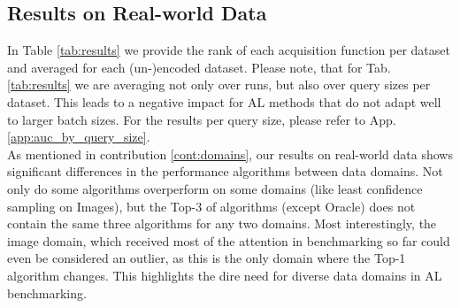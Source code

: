 \documentclass[]{article}
\begin{document}
\subsection{Results on Real-world Data}
In Table \ref{tab:results} we provide the rank of each acquisition function per dataset and averaged for each (un-)encoded dataset. 
Please note, that for Tab. \ref{tab:results} we are averaging not only over runs, but also over query sizes per dataset. 
This leads to a negative impact for AL methods that do not adapt well to larger batch sizes.
For the results per query size, please refer to App. \ref{app:auc_by_query_size}. \\
As mentioned in contribution \ref{cont:domains}, our results on real-world data shows significant differences in the performance algorithms between data domains.
Not only do some algorithms overperform on some domains (like least confidence sampling on Images), but the Top-3 of algorithms (except Oracle) does not contain the same three algorithms for any two domains.
Most interestingly, the image domain, which received most of the attention in benchmarking so far could even be considered an outlier, as this is the only domain where the Top-1 algorithm changes.
This highlights the dire need for diverse data domains in AL benchmarking. \\ [1mm]
\end{document}
